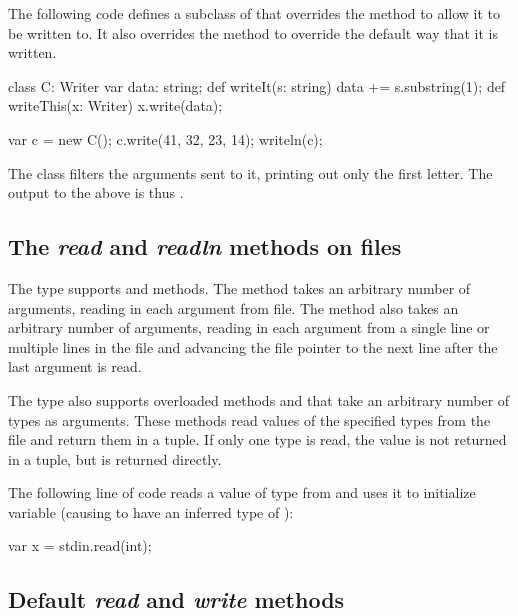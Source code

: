 \begin{example}
The following code defines a subclass of  that overrides
the  method to allow it to be written to.  It also
overrides the  method to override the default way that
it is written.
\begin{chapel}
class C: Writer {
  var data: string;
  def writeIt(s: string) {
    data += s.substring(1);
  }
  def writeThis(x: Writer) {
    x.write(data);
  }
}

var c = new C();
c.write(41, 32, 23, 14);
writeln(c);
\end{chapel}
The  class filters the arguments sent to it, printing out only
the first letter.  The output to the above is thus .
\end{example}


\subsection{The {\em read} and {\em readln} methods on files}
\label{fileread}

The  type supports  and  methods.
The  method takes an arbitrary number of arguments, reading
in each argument from file.  The  method also
takes an arbitrary number of arguments, reading in each argument
from a single line or multiple lines in the file and 
advancing the file pointer to the next line after the last argument 
is read.

The  type also supports overloaded methods 
and  that take an arbitrary number of types as arguments.
These methods read values of the specified types from the file and
return them in a tuple.  If only one type is read, the value is not
returned in a tuple, but is returned directly.

\begin{example}
The following line of code reads a value of type  from
 and uses it to initialize variable  (causing
 to have an inferred type of ):
\begin{chapel}
var x = stdin.read(int);
\end{chapel}
\end{example}


\subsection{Default {\em read} and {\em write} methods}

